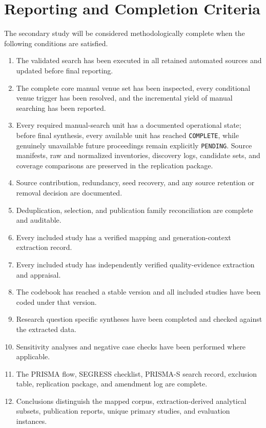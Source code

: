 \section{Reporting and Completion Criteria}
\label{sec:protocol_reporting}

The secondary study will be considered methodologically complete when the following conditions are satisfied.

\begin{enumerate}[label=\arabic*)]
    \item The validated search has been executed in all retained automated sources and updated before final reporting.
    \item The complete core manual venue set has been inspected, every conditional venue trigger has been resolved, and the incremental yield of manual searching has been reported.
    \item Every required manual-search unit has a documented operational state; before final synthesis, every available unit has reached \texttt{COMPLETE}, while genuinely unavailable future proceedings remain explicitly \texttt{PENDING}. Source manifests, raw and normalized inventories, discovery logs, candidate sets, and coverage comparisons are preserved in the replication package.
    \item Source contribution, redundancy, seed recovery, and any source retention or removal decision are documented.
    \item Deduplication, selection, and publication family reconciliation are complete and auditable.
    \item Every included study has a verified mapping and generation-context extraction record.
    \item Every included study has independently verified quality-evidence extraction and appraisal.
    \item The codebook has reached a stable version and all included studies have been coded under that version.
    \item Research question specific syntheses have been completed and checked against the extracted data.
    \item Sensitivity analyses and negative case checks have been performed where applicable.
    \item The PRISMA flow, SEGRESS checklist, PRISMA-S search record, exclusion table, replication package, and amendment log are complete.
    \item Conclusions distinguish the mapped corpus, extraction-derived analytical subsets, publication reports, unique primary studies, and evaluation instances.
\end{enumerate}

